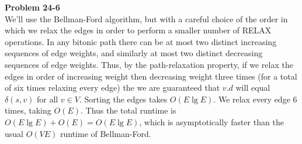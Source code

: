 \documentclass{article}
\begin{document}
\noindent\textbf{Problem 24-6}\\

We'll use the Bellman-Ford algorithm, but with a careful choice of the order in which we relax the edges in order to perform a smaller number of RELAX operations.  In any bitonic path there can be at most two distinct increasing sequences of edge weights, and similarly at most two distinct decreasing sequences of edge weights.  Thus, by the path-relaxation property, if we relax the edges in order of increasing weight then decreasing weight three times (for a total of six times relaxing every edge) the we are guaranteed that $v.d$ will equal $\delta(s,v)$ for all $v \in V$. Sorting the edges takes $O(E \lg E)$. We relax every edge 6 times, taking $O(E)$.  Thus the total runtime is $O(E \lg E) + O(E) = O(E \lg E)$, which is asymptotically faster than the usual $O(VE)$ runtime of Bellman-Ford.
\end{document}
